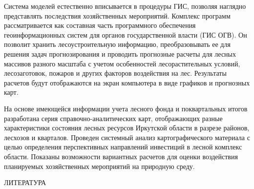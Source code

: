 \documentclass{report}
\begin{document}
Система моделей естественно вписывается в процедуры ГИС, позволяя наглядно представлять последствия хозяйственных
мероприятий. Комплекс программ рассматривается как составная часть программного обеспечения геоинформационных систем
для органов государственной власти (ГИС ОГВ). Он позволит хранить лесоустроительную информацию, преобразовывать ее для
решения задач прогнозирования и проводить прогнозные расчеты для лесных массивов разного масштаба с учетом особенностей
лесорастительных условий, лесозаготовок, пожаров и других факторов воздействия на лес. Результаты расчетов будут
отображаются на экран компьютера в виде графиков и прогнозных карт. 

На основе имеющейся информации учета лесного фонда и поквартальных итогов разработана серия справочно-аналитических
карт, отображающих разные характеристики состояния лесных ресурсов Иркутской области в разрезе районов, лесхозов и
кварталов. Проведен системный анализ картографического материала с целью определения перспективных направлений
инвестиций в лесной комплекс области. Показаны возможности вариантных расчетов для оценки воздействия планируемых
хозяйственных мероприятий на природную среду. 

ЛИТЕРАТУРА
\end{document}
